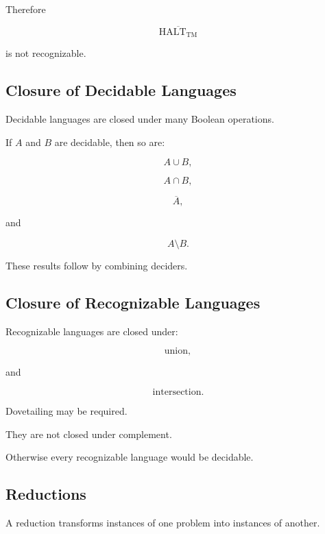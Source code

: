 Therefore

\[
\boxed{
\overline{
\operatorname{HALT}_{\mathrm{TM}}
}
}
\]

is not recognizable.

\subsection{Closure of Decidable Languages}
\label{subsec:closure-decidable-languages}

Decidable languages are closed under many Boolean operations.

If \(A\) and \(B\) are decidable, then so are:

\[
\boxed{
A\cup B,
}
\]

\[
\boxed{
A\cap B,
}
\]

\[
\boxed{
\overline{A},
}
\]

and

\[
\boxed{
A\setminus B.
}
\]

These results follow by combining deciders.

\subsection{Closure of Recognizable Languages}
\label{subsec:closure-recognizable-languages}

Recognizable languages are closed under:

\[
\boxed{
\text{union},
}
\]

and

\[
\boxed{
\text{intersection}.
}
\]

Dovetailing may be required.

They are not closed under complement.

Otherwise every recognizable language would be decidable.

\subsection{Reductions}
\label{subsec:computability-reductions}

A reduction transforms instances of one problem into instances of another.

